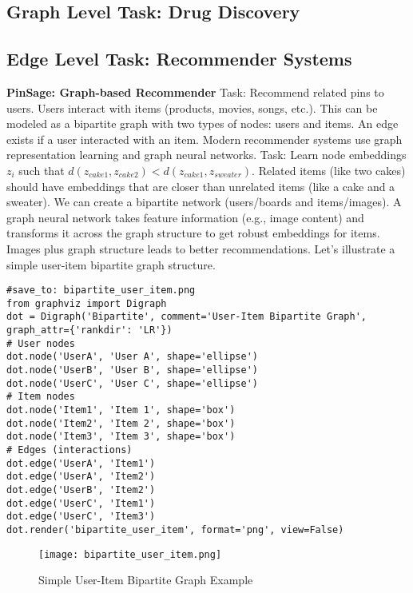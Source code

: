 \documentclass{article}
\begin{document}
\subsection{Graph Level Task: Drug Discovery}
\subsection{Edge Level Task: Recommender Systems}
\textbf{PinSage: Graph-based Recommender}
Task: Recommend related pins to users.
Users interact with items (products, movies, songs, etc.). This can be modeled as a bipartite graph with two types of nodes: users and items. An edge exists if a user interacted with an item.
Modern recommender systems use graph representation learning and graph neural networks.
Task: Learn node embeddings $z_i$ such that $d(z_{cake1}, z_{cake2}) < d(z_{cake1}, z_{sweater})$. Related items (like two cakes) should have embeddings that are closer than unrelated items (like a cake and a sweater).
We can create a bipartite network (users/boards and items/images). A graph neural network takes feature information (e.g., image content) and transforms it across the graph structure to get robust embeddings for items. Images plus graph structure leads to better recommendations.
Let's illustrate a simple user-item bipartite graph structure.
\begin{verbatim}
#save_to: bipartite_user_item.png
from graphviz import Digraph
dot = Digraph('Bipartite', comment='User-Item Bipartite Graph', graph_attr={'rankdir': 'LR'})
# User nodes
dot.node('UserA', 'User A', shape='ellipse')
dot.node('UserB', 'User B', shape='ellipse')
dot.node('UserC', 'User C', shape='ellipse')
# Item nodes
dot.node('Item1', 'Item 1', shape='box')
dot.node('Item2', 'Item 2', shape='box')
dot.node('Item3', 'Item 3', shape='box')
# Edges (interactions)
dot.edge('UserA', 'Item1')
dot.edge('UserA', 'Item2')
dot.edge('UserB', 'Item2')
dot.edge('UserC', 'Item1')
dot.edge('UserC', 'Item3')
dot.render('bipartite_user_item', format='png', view=False)
\end{verbatim}
\begin{figure}[h]
\centering
\texttt{[image: bipartite\_user\_item.png]}
\caption{Simple User-Item Bipartite Graph Example}
\label{fig:bipartite_user_item}
\end{figure}
\end{document}
